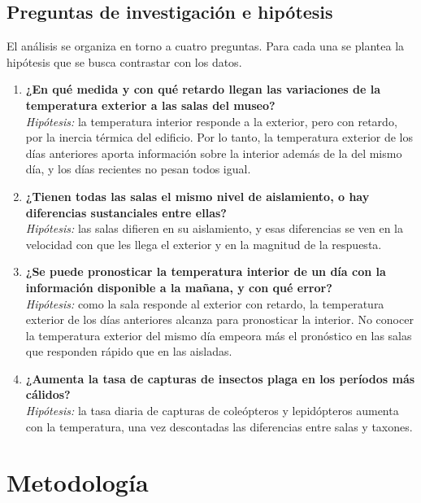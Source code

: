 \documentclass[11pt,a4paper]{article}
\begin{document}
\subsection{Preguntas de investigación e hipótesis}
El análisis se organiza en torno a cuatro preguntas. Para cada una se plantea la hipótesis que se busca contrastar con los datos.
\begin{enumerate}
    \item \textbf{¿En qué medida y con qué retardo llegan las variaciones de la temperatura exterior a las salas del museo?}\\
    \textit{Hipótesis:} la temperatura interior responde a la exterior, pero con retardo, por la inercia térmica del edificio. Por lo tanto, la temperatura exterior de los días anteriores aporta información sobre la interior además de la del mismo día, y los días recientes no pesan todos igual.
    \item \textbf{¿Tienen todas las salas el mismo nivel de aislamiento, o hay diferencias sustanciales entre ellas?}\\
    \textit{Hipótesis:} las salas difieren en su aislamiento, y esas diferencias se ven en la velocidad con que les llega el exterior y en la magnitud de la respuesta.
    \item \textbf{¿Se puede pronosticar la temperatura interior de un día con la información disponible a la mañana, y con qué error?}\\
    \textit{Hipótesis:} como la sala responde al exterior con retardo, la temperatura exterior de los días anteriores alcanza para pronosticar la interior. No conocer la temperatura exterior del mismo día empeora más el pronóstico en las salas que responden rápido que en las aisladas.
    \item \textbf{¿Aumenta la tasa de capturas de insectos plaga en los períodos más cálidos?}\\
    \textit{Hipótesis:} la tasa diaria de capturas de coleópteros y lepidópteros aumenta con la temperatura, una vez descontadas las diferencias entre salas y taxones.
\end{enumerate}

\section{Metodología}
\end{document}
